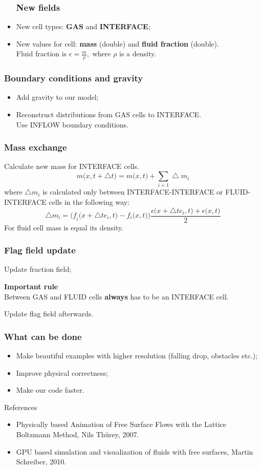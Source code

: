 \documentclass[10pt,a4paper]{beamer}
\DeclareRobustCommand{\mybox}[2][gray!20]{%
\begin{tcolorbox}[   %
        breakable,
        left=0pt,
        right=0pt,
        top=0pt,
        bottom=0pt,
        colback=#1,
        colframe=#1,
        width=\dimexpr\textwidth\relax, 
        enlarge left by=0mm,
        boxsep=5pt,
        arc=0pt,outer arc=0pt,
        ]
        #2
\end{tcolorbox}
}
\begin{document}
\begin{frame}
  \begin{itemize}
    \frametitle{New fields}
  \item New cell types: \textbf{GAS} and \textbf{INTERFACE};
  \item New values for cell: \textbf{mass} (double) and \textbf{fluid fraction} (double).\\
    Fluid fraction is
    \(
    \epsilon = \frac{m}{\rho},
    \)
    where $\rho$ is a density.
  \end{itemize}
\end{frame}
\begin{frame}
  \frametitle{Boundary conditions and gravity}
  \begin{itemize}
  \item Add gravity to our model;
  \item Reconstruct distributions from GAS cells to INTERFACE.\\
    Use INFLOW boundary conditions.
    
  \end{itemize}
\end{frame}

\begin{frame}
  \frametitle{Mass exchange}
  Calculate new mass for INTERFACE cells.
    \begin{equation}
      m\big(x, t+\bigtriangleup t\big) = m\big(x,t\big)+\sum_{i=1}\bigtriangleup m_i
    \end{equation}
    where $\bigtriangleup m_i$ is calculated only between INTERFACE-INTERFACE or
    FLUID-INTERFACE cells in the following way:
    \begin{equation}
      \bigtriangleup m_i = \Big(f_{\bar{i}}\big(x+\bigtriangleup te_i,t\big)-f_i\big(x,t\big)\Big)\frac{\epsilon\big(x+\bigtriangleup te_i,t\big)+\epsilon\big(x,t\big)}{2}
    \end{equation}
    For fluid cell mass is equal its density.
\end{frame}

\begin{frame}
  \frametitle{Flag field update}
  Update fraction field;
  \mybox[green!20]{
    \textbf{Important rule}\\
    Between GAS and FLUID cells \textbf{always} has to be
    an INTERFACE cell.
  }
  Update flag field afterwards. 
\end{frame}
\begin{frame}
  \frametitle{What can be done}
  \begin{itemize}
  \item Make beautiful examples with higher resolution (falling drop, obstacles
    etc.);
    \item Improve physical correctness;
  \item Make our code faster.
  \end{itemize}
\end{frame}

\begin{frame}
  References
  \begin{itemize}
  \item Physically based Animation of Free Surface Flows with the Lattice
    Boltzmann Method, Nils Thürey, 2007.
  \item GPU based simulation and visualization of fluids with free surfaces, Martin Schreiber, 2010.
  \end{itemize}
\end{frame}
\end{document}
